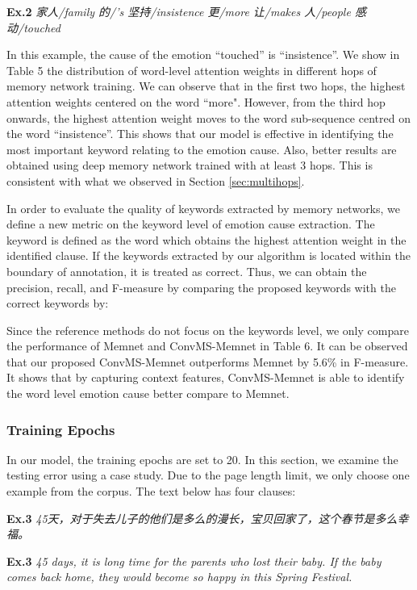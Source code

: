 \documentclass[11pt,letterpaper]{article}
\begin{document}
\begin{CJK*}{UTF8}{gbsn}
\noindent \textbf{Ex.2} \emph{家人/family 的/'s 坚持/insistence 更/more 让/makes 人/people 感动/touched}

In this example, the cause of the emotion ``touched'' is ``insistence''. We show in Table 5 the distribution of word-level attention weights in different hops of memory network training. We can observe that in the first two hops, the highest attention weights centered on the word ``more". However, from the third hop onwards, the highest attention weight moves to the word sub-sequence centred on the word ``insistence''. This shows that our model is effective in identifying the most important keyword relating to the emotion cause. Also, better results are obtained using deep memory network trained with at least 3 hops. This is consistent with what we observed in Section \ref{sec:multihops}.

In order to evaluate the quality of keywords extracted by memory networks, we define a new metric on the keyword level of emotion cause extraction. The keyword is defined as the word which obtains the highest attention weight in the identified clause. If the keywords extracted by our algorithm is located within the boundary of annotation, it is treated as correct. Thus, we can obtain the precision, recall, and F-measure by comparing the proposed keywords with the correct keywords by:




Since the reference methods do not focus on the keywords level, we only compare the performance of Memnet and ConvMS-Memnet in Table 6. It can be observed that our proposed ConvMS-Memnet outperforms Memnet by 5.6\% in F-measure. It shows that by capturing context features, ConvMS-Memnet is able to identify the word level emotion cause better compare to Memnet.




\subsubsection{Training Epochs}
\label{sec:trainIterations}

In our model, the training epochs are set to 20. In this section, we examine the testing error using a case study. Due to the page length limit, we only choose one example from the corpus. The text below has four clauses:

\noindent \textbf{Ex.3} \emph{45天，对于失去儿子的他们是多么的漫长，宝贝回家了，这个春节是多么幸福。}

\noindent \textbf{Ex.3} \emph{45 days, it is long time for the parents who lost their baby. If the baby comes back home, they would become so happy in this Spring Festival.}


\end{CJK*}
\end{document}
